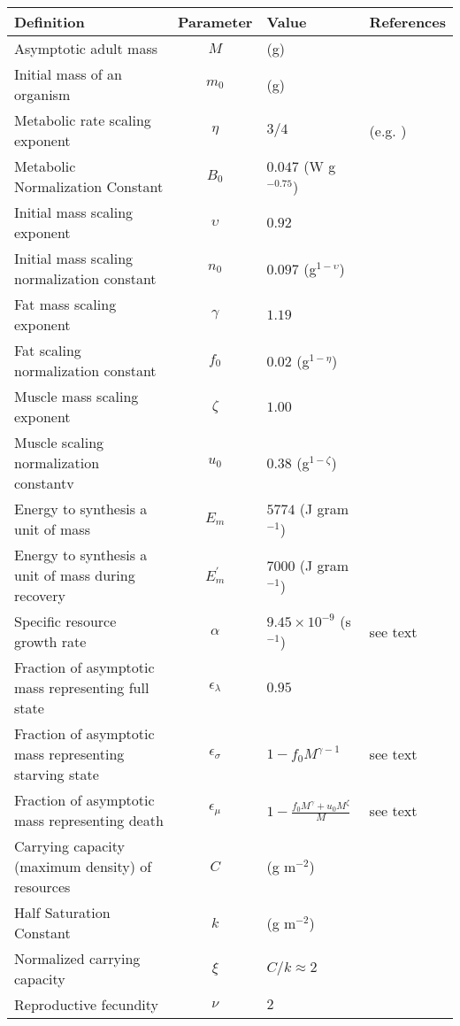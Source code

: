 \documentclass[twocolumn,preprintnumbers,amsmath,amssymb,superscriptaddress]{revtex4}
\begin{document}
\begin{table}[h]
{\begin{center}
\begin{tabular}{p{3.8cm} c p{2.2cm} p{1.4cm}}
     Definition & Parameter & Value & References  \\
     \hline
   Asymptotic adult mass & $M$ & (g) &  \\
   Initial mass of an organism & $m_{0}$ & (g) &  \\
   Metabolic rate scaling exponent & $\eta$ & $3/4$  &  (e.g. \citep{West:2001bv,moses2008rmo,hou}) \\
   Metabolic Normalization Constant & $B_{0}$ & $0.047$ (W g$^{-0.75}$)    & \citep{hou}  \\
   Initial mass scaling exponent & $\upsilon$ & $0.92$ &  \citep{blueweiss1978relationships,peters1986ecological} \\
   Initial mass scaling normalization constant & $n_{0}$ & $0.097$ (g$^{1-\upsilon}$) & \citep{blueweiss1978relationships,peters1986ecological}  \\   
   Fat mass scaling exponent & $\gamma$ & $1.19$ & \citep{Lindstedt:1985hm} \\
   Fat scaling normalization constant & $f_{0}$ & $0.02$ (g$^{1-\eta}$) & \citep{Lindstedt:1985hm}\\
   Muscle mass scaling exponent & $\zeta$ & $1.00$  & \citep{Lindstedt:2002td} \\
   Muscle scaling normalization constantv& $u_{0}$ & $0.38$ (g$^{1-\zeta}$)  & \citep{Lindstedt:2002td} \\
   Energy to synthesis a unit of mass & $E_{m}$ & $5774$ (J gram$^{-1}$)  &  \citep{moses2008rmo,West:2001bv,hou} \\
   Energy to synthesis a unit of mass during recovery & $E_{m}^{\prime}$ & $7000$ (J gram$^{-1}$) & \citep{stryer,hou} \\
   Specific resource growth rate & $\alpha$ & $9.45\times10^{-9}$ (s$^{-1}$) & see text  \\
   Fraction of asymptotic mass representing full state & $\epsilon_{\lambda}$ & $0.95$ & \citep{West:2001bv}  \\
   Fraction of asymptotic mass representing starving state & $\epsilon_{\sigma}$ & $1-f_{0}M^{\gamma-1}$ & see text  \\
   Fraction of asymptotic mass representing death & $\epsilon_{\mu}$ & $1-\frac{f_{0}M^{\gamma}+u_{0}M^{\zeta}}{M}$ & see text \\
   Carrying capacity (maximum density) of resources & $C$ & (g m$^{-2}$) & \\
   Half Saturation Constant & $k$ & (g m$^{-2}$) &   \\
   Normalized carrying capacity & $\xi$ & $C/k\approx2$ &   \\
   Reproductive fecundity & $\nu$ & $2$ & \citep{}  \\ 
   
   
   

   \hline
    \end{tabular}
    \end{center}
    }
   \end{table}
\end{document}

